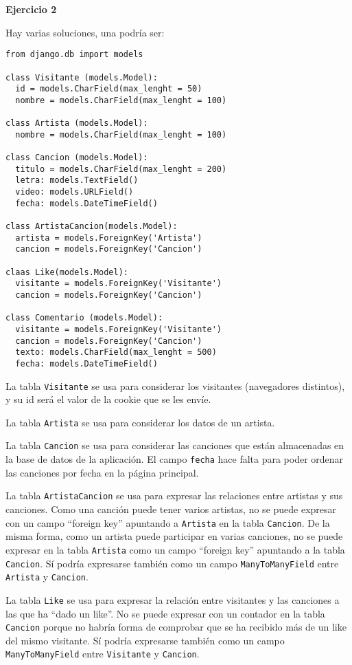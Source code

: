 \textbf{Ejercicio 2}

Hay varias soluciones, una podría ser:

\begin{verbatim}
from django.db import models

class Visitante (models.Model):
  id = models.CharField(max_lenght = 50)
  nombre = models.CharField(max_lenght = 100)

class Artista (models.Model):
  nombre = models.CharField(max_lenght = 100)

class Cancion (models.Model):
  titulo = models.CharField(max_lenght = 200)
  letra: models.TextField()
  video: models.URLField()
  fecha: models.DateTimeField()

class ArtistaCancion(models.Model):
  artista = models.ForeignKey('Artista')
  cancion = models.ForeignKey('Cancion')

claas Like(models.Model):
  visitante = models.ForeignKey('Visitante')
  cancion = models.ForeignKey('Cancion')

class Comentario (models.Model):
  visitante = models.ForeignKey('Visitante')
  cancion = models.ForeignKey('Cancion')
  texto: models.CharField(max_lenght = 500)
  fecha: models.DateTimeField()
\end{verbatim}

La tabla \texttt{Visitante} se usa para considerar los visitantes (navegadores distintos), y su id será el valor de la cookie que se les envíe.

La tabla \texttt{Artista} se usa para considerar los datos de un artista.

La tabla \texttt{Cancion} se usa para considerar las canciones que están almacenadas en la base de datos de la aplicación. El campo \texttt{fecha} hace falta para poder ordenar las canciones por fecha en la página principal.

La tabla \texttt{ArtistaCancion} se usa para expresar las relaciones entre artistas y sus canciones. Como una canción puede tener varios artistas, no se puede expresar con un campo ``foreign key'' apuntando a \texttt{Artista} en la tabla \texttt{Cancion}. De la misma forma, como un artista puede participar en varias canciones, no se puede expresar en la tabla \texttt{Artista} como un campo ``foreign key'' apuntando a la tabla \texttt{Cancion}. Sí podría expresarse también como un campo \texttt{ManyToManyField} entre \texttt{Artista} y \texttt{Cancion}.

La tabla \texttt{Like} se usa para expresar la relación entre visitantes y las canciones a las que ha ``dado un like''. No se puede expresar con un contador en la tabla \texttt{Cancion} porque no habría forma de comprobar que se ha recibido más de un like del mismo visitante. Sí podría expresarse también como un campo \texttt{ManyToManyField} entre \texttt{Visitante} y \texttt{Cancion}.



